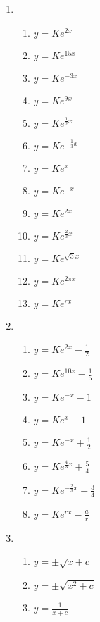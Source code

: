 \documentclass[a4paper]{article}
\begin{document}
\begin{enumerate}
\item 

  \begin{enumerate}
  \item $y = Ke^{2x}$
  \item $y = Ke^{15x}$
  \item $y = Ke^{-3x}$
  \item $y = Ke^{9x}$
  \item $y = Ke^{\frac{1}{2}x}$
  \item $y = Ke^{-\frac{1}{3}x}$
  \item $y = Ke^{x}$
  \item $y = Ke^{-x}$
  \item $y = Ke^{2x}$
  \item $y = Ke^{\frac{2}{3}x}$
  \item $y = Ke^{\sqrt{3}x}$
  \item $y = Ke^{2\pi x}$
  \item $y = Ke^{rx}$
  \end{enumerate}


\item 

  \begin{enumerate}
  \item $y = Ke^{2x} - \frac{1}{2}$
  \item $y = Ke^{10x} - \frac{1}{5}$
  \item $y = Ke^{-x} - 1$
  \item $y = Ke^{x} + 1$
  \item $y = Ke^{-x} + \frac{1}{2}$
  \item $y = Ke^{\frac{4}{3}x} + \frac{5}{4}$
  \item $y = Ke^{-\frac{2}{3}x} - \frac{3}{4}$
  \item $y = Ke^{rx} - \frac{a}{r}$
  \end{enumerate}

\item 

  \begin{enumerate}
  \item $y = \pm \sqrt{x + c}$
  \item $y = \pm \sqrt{x^2 + c}$
  \item $y = \frac{1}{x+c}$
  \end{enumerate}
\end{enumerate}
\end{document}
